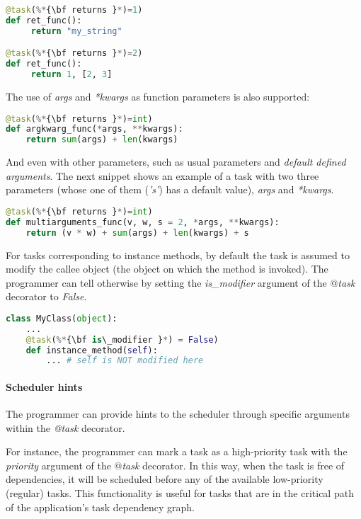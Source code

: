 \begin{lstlisting}[language=python]
@task(%*{\bf returns }*)=1)
def ret_func():
     return "my_string"

@task(%*{\bf returns }*)=2)
def ret_func():
     return 1, [2, 3]
\end{lstlisting}

The use of {\it *args} and {\it **kwargs} as function parameters is also supported:

\begin{lstlisting}[language=python]
@task(%*{\bf returns }*)=int)
def argkwarg_func(*args, **kwargs):
    return sum(args) + len(kwargs)
\end{lstlisting}

And even with other parameters, such as usual parameters and {\it default defined arguments}. The next 
snippet shows an example of a task with two three parameters (whose one of them ({\it 's'}) has a default
value), {\it *args} and {\it **kwargs}.

\begin{lstlisting}[language=python]
@task(%*{\bf returns }*)=int)
def multiarguments_func(v, w, s = 2, *args, **kwargs):
    return (v * w) + sum(args) + len(kwargs) + s
\end{lstlisting}

For tasks corresponding to instance methods, by default the task is assumed to modify the callee object 
(the object on which the method is invoked). The programmer can tell otherwise by setting the 
{\it is\_modifier} argument of the {\it $@$task} decorator to {\it False}.

\begin{lstlisting}[language=python]
class MyClass(object):
    ...
    @task(%*{\bf is\_modifier }*) = False)
    def instance_method(self):
        ... # self is NOT modified here
\end{lstlisting}

\paragraph{Scheduler hints}

The programmer can provide hints to the scheduler through specific arguments within the {\it @task} decorator.

For instance, the programmer can mark a task as a high-priority task with the {\it priority} argument of the 
{\it $@$task} decorator. In this way, when the task is free of dependencies, it will be scheduled before 
any of the available low-priority (regular) tasks. This functionality is useful for tasks that are in 
the critical path of the application’s task dependency graph.

